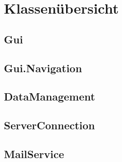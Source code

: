 \section{Klassenübersicht}

\subsection{Gui}

\newpage

\newpage

\newpage

\newpage

\newpage

\newpage

\newpage
\subsection{Gui.Navigation}

\newpage
\subsection{DataManagement}

\newpage

\newpage

\newpage

\newpage
\subsection{ServerConnection}

\newpage
\subsection{MailService}


